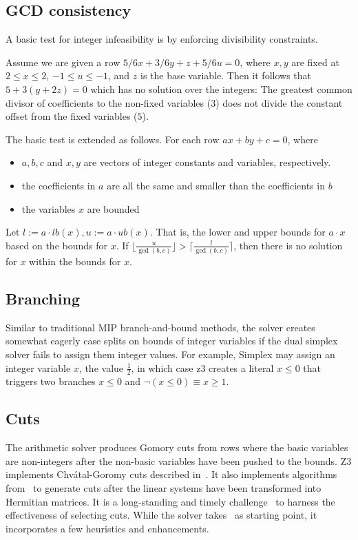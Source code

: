 \subsection{GCD consistency}\label{sec:gcd-consistency}
A basic test for integer infeasibility is by enforcing divisibility constraints.
\begin{example}
  Assume we are given a row $5/6x + 3/6y + z + 5/6u = 0$, where $x, y$ are fixed at $2 \leq x \leq 2$, $-1 \leq u \leq -1$, and $z$ is the base variable.
  Then it follows that $5 + 3(y + 2z) = 0$ which has no solution over the integers:
  The greatest common divisor of coefficients to the non-fixed variables ($3$) does not divide the constant offset from the fixed variables ($5$).
\end{example}
The basic test is extended as follows. For each row $a x + b y + c = 0$, where
\begin{itemize}
  \item $a, b, c$ and $x, y$ are vectors of integer constants and variables, respectively.
  \item the coefficients in $a$ are all the same and smaller than the coefficients in $b$
  \item the variables $x$ are bounded
\end{itemize}
Let $l := a\cdot lb(x), u := a \cdot ub(x)$.
That is, the lower and upper bounds for $a\cdot x$ based on the bounds for $x$.
If $\lfloor \frac{u}{\gcd(b,c)} \rfloor > \lceil  \frac{l}{\gcd(b,c)} \rceil$, then
there is no solution for $x$ within the bounds for $x$.



\subsection{Branching}
Similar to traditional MIP branch-and-bound methods, 
the solver creates somewhat eagerly case splits on bounds 
of integer variables if the dual simplex solver fails to assign them integer values. For example, Simplex may assign an integer variable $x$, the value $\frac{1}{2}$, in which case z3 creates a literal $x \leq 0$ that triggers two branches
$x \leq 0$ and $\neg(x \leq 0) \equiv x \geq 1$.


\subsection{Cuts}\label{sec:cuts}
The arithmetic solver produces Gomory cuts from rows where the basic variables are non-integers after
the non-basic variables have been pushed to the bounds. Z3 implements Chv{\'a}tal-Goromy cuts described in~\cite{DutertreM06}.
It also implements algorithms from~\cite{DilligDA09,ChristH15}
to generate cuts after the linear systems have been transformed into Hermitian matrices.
It is a long-standing and timely challenge~\cite{DBLP:conf/nips/BalcanPSV22} to harness the effectiveness of selecting cuts.
While the solver takes~\cite{DutertreM06} as starting point, it incorporates a few heuristics and enhancements.

